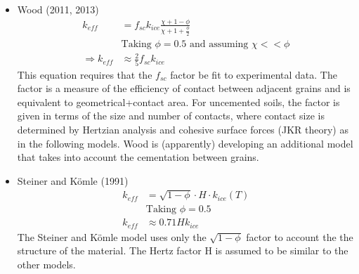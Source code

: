 \documentclass[11pt]{article} %
\begin{document}
	\begin{itemize}
	\item Wood (2011, 2013)
		\begin{equation}
		\begin{split}
		k_{eff}  &= f_{sc} k_{ice} \frac{\chi + 1 - \phi}{\chi + 1 + \frac{\phi}{2}} \\
		&\text{Taking $\phi = 0.5$ and assuming $\chi << \phi$} \\
		\Rightarrow k_{eff} &\approx \frac{2}{5} f_{sc} k_{ice}
		\end{split}
		\end{equation}
	This equation requires that the $f_{sc}$ factor be fit to experimental data. The factor is a measure of the efficiency of contact between adjacent grains and is equivalent to geometrical+contact area. For uncemented soils, the factor is given in terms of the size and number of contacts, where contact size is determined by Hertzian analysis and cohesive surface forces (JKR theory) as in the following models. Wood is (apparently) developing an additional model that takes into account the cementation between grains. 
		

	\item Steiner and K\"{o}mle (1991)
		\begin{equation}
		\begin{split}
		 k_{eff} &= \sqrt{1-\phi}\cdot H \cdot k_{ice}(T) \\
		&\text{Taking $\phi = 0.5$} \\
		 k_{eff} &\approx 0.71 H k_{ice}
		\end{split}
		\end{equation}
	The Steiner and K\"omle model uses only the $\sqrt{1-\phi}$ factor to account the the structure of the material. The Hertz factor H is assumed to be similar to the other models. 


\end{itemize}
\end{document}
